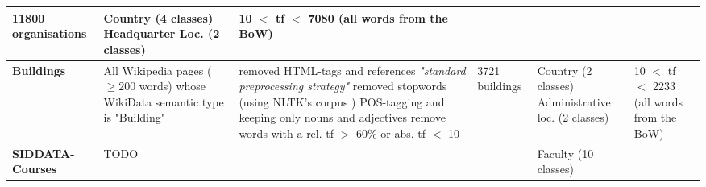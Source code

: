 \begin{landscape}
\begin{table}[]
{\begin{tabular}{@{}llllll@{}}
        		11800 organisations &
        		\specialcell[l]{ \tabitem Country (4 classes)\\ \tabitem Headquarter Loc. (2 classes)} &
        		\specialcell[l]{ 10 $<$ \acrshort{tf} $<$ 7080 \\ (all words from the BoW)} \\ \midrule
        	\textbf{Buildings\footnoteref{fnote:for_alshaikh2019} \cite{Alshaikh2020}} &
        		\specialcell[l]{All Wikipedia pages ($\geq 200$ words) whose \\ WikiData semantic type is "Building"} &
        		\specialcell[l]{ \tabitem removed HTML-tags and references \\ \tabitem \textit{"standard preprocessing strategy"} \cite[137]{Alshaikh2019} \\ \tabitem removed stopwords (using NLTK's corpus \cite{loper-bird-2002-nltk})\\ \tabitem POS-tagging and keeping only nouns and adjectives \\ \tabitem remove words with a rel. \acrshort{tf}  $>$ 60\% or abs. \acrshort{tf} $<$ 10 } &
        		3721 buildings &
        		\specialcell[l]{ \tabitem Country (2 classes)\\ \tabitem Administrative loc. (2 classes)} &
        		\specialcell[l]{10 $<$ \acrshort{tf} $<$ 2233 \\ (all words from the BoW) }\\ \Xhline{4\arrayrulewidth}
        	\textbf{SIDDATA-Courses} &
        		TODO &
        		&
        		&
        		\tabitem Faculty (10 classes) 
        		\\ 
        \end{tabular}
        }
        \end{table}
    \end{landscape}


\restoregeometry %



